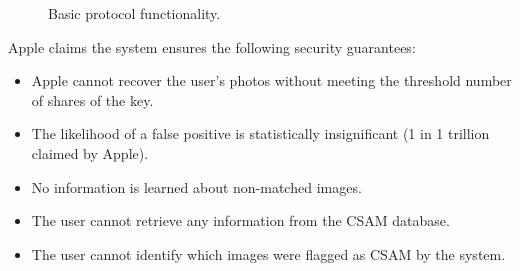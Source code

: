 \begin{figure*}[t]
	\centering
	
	\caption{Basic protocol functionality.}
	\label{fig:proto}
\end{figure*}
\noindent 
Apple claims the system ensures the following security guarantees:
\begin{itemize}
	\item Apple cannot recover the user's photos without meeting the threshold number of shares of the key.
	\item The likelihood of a false positive is statistically insignificant (1 in 1 trillion claimed by Apple).
	\item No information is learned about non-matched images.
	\item The user cannot retrieve any information from the CSAM database.
	\item The user cannot identify which images were flagged as CSAM by the system.
\end{itemize}

